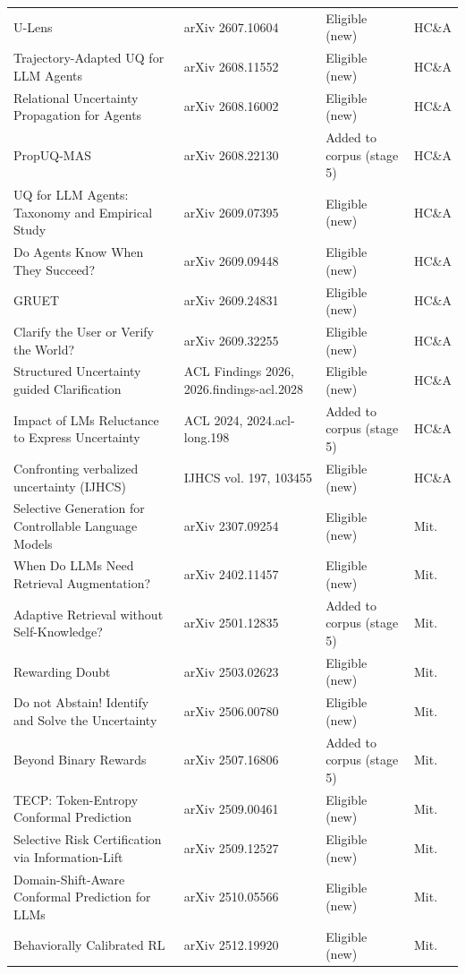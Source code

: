 \documentclass[acmsmall]{acmart}
\begin{document}
\begin{center}
\begin{longtable}{@{}p{5.6cm} p{3.6cm} p{2.4cm} p{0.9cm}@{}}
U-Lens & arXiv 2607.10604 & Eligible (new) & HC\&A \\
Trajectory-Adapted UQ for LLM Agents & arXiv 2608.11552 & Eligible (new) & HC\&A \\
Relational Uncertainty Propagation for Agents & arXiv 2608.16002 & Eligible (new) & HC\&A \\
PropUQ-MAS & arXiv 2608.22130 & Added to corpus (stage 5) & HC\&A \\
UQ for LLM Agents: Taxonomy and Empirical Study & arXiv 2609.07395 & Eligible (new) & HC\&A \\
Do Agents Know When They Succeed? & arXiv 2609.09448 & Eligible (new) & HC\&A \\
GRUET & arXiv 2609.24831 & Eligible (new) & HC\&A \\
Clarify the User or Verify the World? & arXiv 2609.32255 & Eligible (new) & HC\&A \\
Structured Uncertainty guided Clarification & ACL Findings 2026, 2026.findings-acl.2028 & Eligible (new) & HC\&A \\
Impact of LMs Reluctance to Express Uncertainty & ACL 2024, 2024.acl-long.198 & Added to corpus (stage 5) & HC\&A \\
Confronting verbalized uncertainty (IJHCS) & IJHCS vol. 197, 103455 & Eligible (new) & HC\&A \\
Selective Generation for Controllable Language Models & arXiv 2307.09254 & Eligible (new) & Mit. \\
When Do LLMs Need Retrieval Augmentation? & arXiv 2402.11457 & Eligible (new) & Mit. \\
Adaptive Retrieval without Self-Knowledge? & arXiv 2501.12835 & Added to corpus (stage 5) & Mit. \\
Rewarding Doubt & arXiv 2503.02623 & Eligible (new) & Mit. \\
Do not Abstain! Identify and Solve the Uncertainty & arXiv 2506.00780 & Eligible (new) & Mit. \\
Beyond Binary Rewards & arXiv 2507.16806 & Added to corpus (stage 5) & Mit. \\
TECP: Token-Entropy Conformal Prediction & arXiv 2509.00461 & Eligible (new) & Mit. \\
Selective Risk Certification via Information-Lift & arXiv 2509.12527 & Eligible (new) & Mit. \\
Domain-Shift-Aware Conformal Prediction for LLMs & arXiv 2510.05566 & Eligible (new) & Mit. \\
Behaviorally Calibrated RL & arXiv 2512.19920 & Eligible (new) & Mit. \\

\end{longtable}
\end{center}
\end{document}
